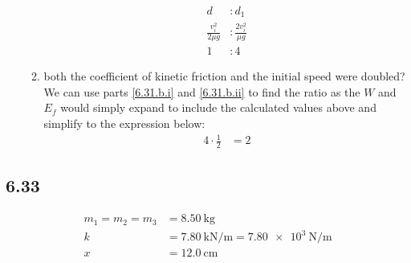 \documentclass{article}
\begin{document}
\begin{enumerate}[label = \textbf{(\alph*)}]
\begin{enumerate}[label = \textbf{(\roman*)}]
\begin{align*}
					d & : d_1 \\
					\frac{v_i^2}{2\mu g} & : \frac{2v_i^2}{\mu g} \\
					1 & : 4
				\end{align*}
			\item both the coefficient of kinetic friction and the initial speed were doubled? \\
				We can use parts \ref{6.31.b.i} and \ref{6.31.b.ii} to find the ratio as the $ W $ and $ E_f $ would simply expand to include the calculated values above and simplify to the expression below:
				\begin{align*}
					4 \cdot \frac{1}{2} & = 2
				\end{align*}
		\end{enumerate}
\end{enumerate}

\subsection{6.33}

\begin{align*}
	m_1 = m_2 = m_3 & = \SI{8.50}{\kilogram} \\
	k & = \SI{7.80}{\kilo \newton \per \meter} = \SI{7.80e3}{\newton \per \meter} \\
	x & = \SI{12.0}{\centi \meter}
\end{align*}
\end{document}
